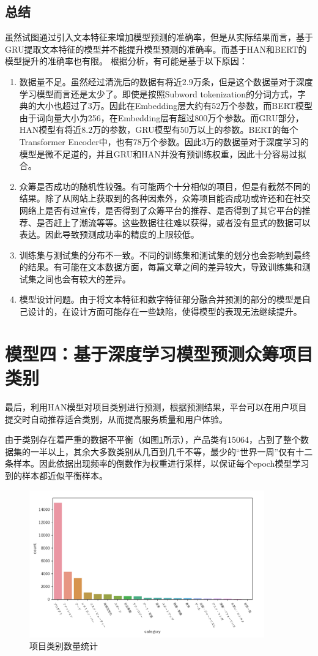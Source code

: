 \documentclass[lang=cn,a4paper]{elegantpaper}
\begin{document}
\subsection{总结}
虽然试图通过引入文本特征来增加模型预测的准确率，但是从实际结果而言，基于GRU提取文本特征的模型并不能提升模型预测的准确率。而基于HAN和BERT的模型提升的准确率也有限。
根据分析，有可能是基于以下原因：
\begin{enumerate}
\item 数据量不足。虽然经过清洗后的数据有将近2.9万条，但是这个数据量对于深度学习模型而言还是太少了。即使是按照Subword tokenization的分词方式，字典的大小也超过了3万。因此在Embedding层大约有52万个参数，而BERT模型由于词向量大小为256，在Embedding层有超过800万个参数。而GRU部分，HAN模型有将近8.2万的参数，GRU模型有50万以上的参数。BERT的每个Transformer Encoder中，也有78万个参数。因此3万的数据量对于深度学习的模型是微不足道的，并且GRU和HAN并没有预训练权重，因此十分容易过拟合。
\item 众筹是否成功的随机性较强。有可能两个十分相似的项目，但是有截然不同的结果。除了从网站上获取到的各种因素外，众筹项目能否成功或许还和在社交网络上是否有过宣传，是否得到了众筹平台的推荐、是否得到了其它平台的推荐、是否赶上了潮流等等。这些数据往往难以获得，或者没有显式的数据可以表达。因此导致预测成功率的精度的上限较低。
\item 训练集与测试集的分布不一致。不同的训练集和测试集的划分也会影响到最终的结果。有可能在文本数据方面，每篇文章之间的差异较大，导致训练集和测试集之间也会有较大的差异。
\item 模型设计问题。由于将文本特征和数字特征部分融合并预测的部分的模型是自己设计的，在设计方面可能存在一些缺陷，使得模型的表现无法继续提升。
\end{enumerate}

\section{模型四：基于深度学习模型预测众筹项目类别}
最后，利用HAN模型对项目类别进行预测，根据预测结果，平台可以在用户项目提交时自动推荐适合类别，从而提高服务质量和用户体验。


由于类别存在着严重的数据不平衡（如图\ref{fig:category}所示），产品类有15064，占到了整个数据集的一半以上，其余大多数类别从几百到几千不等，最少的“世界一周”仅有十二条样本。因此依据出现频率的倒数作为权重进行采样，以保证每个epoch模型学习到的样本都近似平衡样本。
\begin{figure}[!h]
  \centering
  \includegraphics[width=4in]{image/category.pdf}
  \caption{项目类别数量统计}
  \label{fig:category}
\end{figure}
\end{document}
